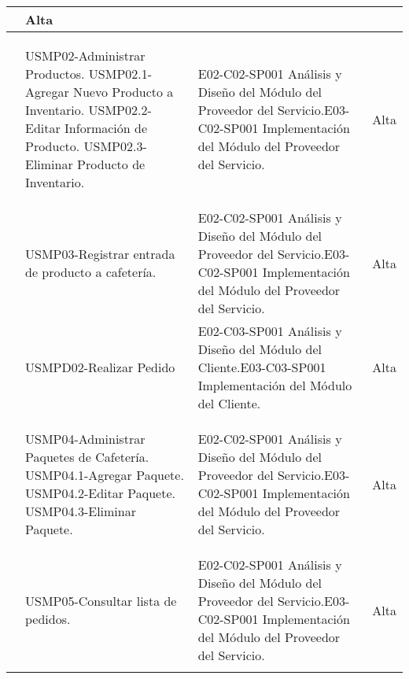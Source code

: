 \begin{center}
\begin{longtable}{|p{}|p{}|p{}|p{}|}
\begin{Titemize}
																\end{Titemize}
											  & Alta\\
\hline
	\getElementById[Requerimiento]{REQMP03} & \begin{Titemize}
												\Titem USMP02-Administrar Productos.
												\Titem USMP02.1-Agregar Nuevo Producto a Inventario.
												\Titem USMP02.2-Editar Información de Producto.
												\Titem USMP02.3-Eliminar Producto de Inventario.
											  \end{Titemize} & \Titem E02-C02-SP001 Análisis y Diseño del Módulo del Proveedor del Servicio.\Titem E03-C02-SP001 Implementación del Módulo del Proveedor del Servicio. & Alta\\
\hline
	\getElementById[Requerimiento]{REQMP04} & \begin{Titemize}
												\Titem USMP03-Registrar entrada de producto a cafetería.
											  \end{Titemize} & \Titem E02-C02-SP001 Análisis y Diseño del Módulo del Proveedor del Servicio.\Titem E03-C02-SP001 Implementación del Módulo del Proveedor del Servicio.& Alta\\
\hline
	\getElementById[Requerimiento]{REQMP09} & \begin{Titemize}
												\Titem USMPD02-Realizar Pedido
											  \end{Titemize} & \Titem E02-C03-SP001 Análisis y Diseño del Módulo del Cliente.\Titem E03-C03-SP001 Implementación del Módulo del Cliente. & Alta\\
\hline
	\getElementById[Requerimiento]{REQMP05} & \begin{Titemize}
												 \Titem USMP04-Administrar Paquetes de Cafetería.
												 \Titem USMP04.1-Agregar Paquete.
												 \Titem USMP04.2-Editar Paquete.
												 \Titem USMP04.3-Eliminar Paquete.
											  \end{Titemize} & \Titem E02-C02-SP001 Análisis y Diseño del Módulo del Proveedor del Servicio.\Titem E03-C02-SP001 Implementación del Módulo del Proveedor del Servicio.& Alta\\
\hline
	\getElementById[Requerimiento]{REQMP06} & \begin{Titemize}
												\Titem USMP05-Consultar lista de pedidos.
											  \end{Titemize} & \Titem E02-C02-SP001 Análisis y Diseño del Módulo del Proveedor del Servicio.\Titem E03-C02-SP001 Implementación del Módulo del Proveedor del Servicio. & Alta\\
\hline
	\getElementById[Requerimiento]{REQMP07}& \begin{Titemize}

\end{Titemize}
\end{longtable}
\end{center}
